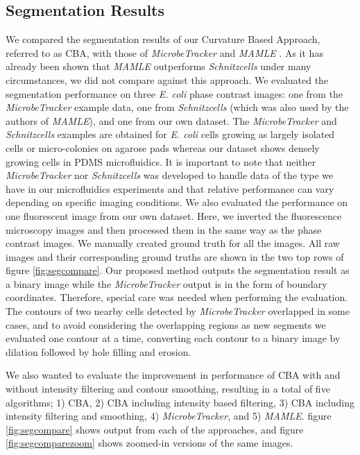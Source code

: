 \documentclass[journal]{IEEEtran}
\begin{document}
\subsection{Segmentation Results}
We compared the segmentation results of our Curvature Based Approach, referred to as CBA, with those of \textit{MicrobeTracker} \cite {sliusarenkohigh2011} and \textit{MAMLE} \cite {chowdhurycell2013}.  As it has already been shown that \textit{MAMLE} outperforms \textit{Schnitzcells} \cite { youngmeasuring2012} under many circumstances, we did not compare against this approach. We evaluated the segmentation performance on three \textit{E. coli} phase contrast images: one from the \textit{MicrobeTracker} example data, one from \textit{Schnitzcells} (which was also used by the authors of \textit{MAMLE}), and one from our own dataset. The \textit{MicrobeTracker} and  \textit{Schnitzcells} examples are obtained for \textit{E. coli} cells growing as largely isolated cells or micro-colonies on agarose pads whereas our dataset shows densely growing cells in PDMS microfluidics. It is important to note that neither \textit{MicrobeTracker} nor \textit{Schnitzcells} was developed to handle data of the type we have in our microfluidics experiments and that relative performance can vary depending on specific imaging conditions.  We also evaluated the performance on one fluorescent image from our own dataset. Here, we inverted the fluorescence microscopy images and then processed them in the same way as the phase contrast images. We manually created ground truth for all the images. All raw images and their corresponding ground truths are shown in the two top rows of figure \ref{fig:segcompare}. Our proposed method outputs the segmentation result as a binary image while the \textit{MicrobeTracker} output is in the form of boundary coordinates. Therefore, special care was needed when performing the evaluation. The contours of two nearby cells detected by \textit{MicrobeTracker} overlapped in some cases, and to avoid considering the overlapping regions as new segments we evaluated one contour at a time, converting each contour to a binary image by dilation followed by hole filling and erosion.

We also wanted to evaluate the improvement in performance of CBA with and without intensity filtering and contour smoothing, resulting in a total of five algorithms; 1) CBA, 2) CBA including intensity based filtering, 3) CBA including intensity filtering and smoothing, 4) \textit{MicrobeTracker}, and 5) \textit{MAMLE}. figure \ref{fig:segcompare} shows output from each of the approaches, and figure \ref{fig:segcomparezoom} shows zoomed-in versions of the same images.
\end{document}
